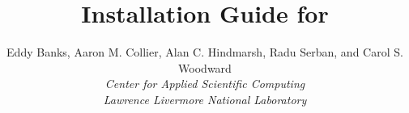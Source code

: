 \documentclass[twoside,openright,10pt]{report}
\title{Installation Guide for {\sundials} {\sunrelease}}
\author{
  Eddy Banks, Aaron M. Collier, Alan C. Hindmarsh, Radu Serban, and Carol S. Woodward\\
  {\em Center for Applied Scientific Computing} \\
  {\em Lawrence Livermore National Laboratory}
}
\date{
  \today 
  \vfill {\centerline{\texttt{[image: doc\_logo]}}}
  \vfill \kinucrlug
}
\begin{document}
\frontex


\clearemptydoublepage
\end{document}
